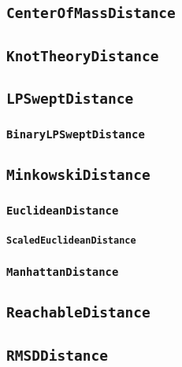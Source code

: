 \subsection{\texttt{CenterOfMassDistance}}

\subsection{\texttt{KnotTheoryDistance}}

\subsection{\texttt{LPSweptDistance}}

\subsubsection{\texttt{BinaryLPSweptDistance}}

\subsection{\texttt{MinkowskiDistance}}

\subsubsection{\texttt{EuclideanDistance}}

\paragraph{\texttt{ScaledEuclideanDistance}}

\subsubsection{\texttt{ManhattanDistance}}

\subsection{\texttt{ReachableDistance}}

\subsection{\texttt{RMSDDistance}}

